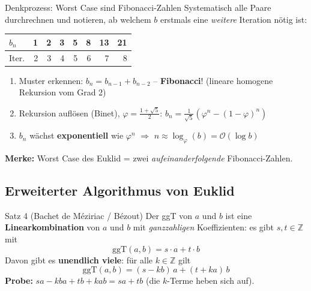 \documentclass[a4paper, fontsize=7pt]{scrartcl}
\def\Z{\mathbb{Z}}  %
\def\oof{\mathcal{O}}
\renewcommand*{\arraystretch}{1.5}  %
\begin{document}
\begin{subbox}{Denkprozess: Worst Case sind Fibonacci-Zahlen}
Systematisch alle Paare durchrechnen und notieren, ab welchem $b$ erstmals
eine \emph{weitere} Iteration nötig ist:
\renewcommand*{\arraystretch}{1.1}
\begin{center}
\setlength{\tabcolsep}{3pt}
\begin{tabular}{@{}l|rrrrrrr@{}}
$b_n$ & 1 & 2 & 3 & 5 & 8 & 13 & 21 \\
\hline
Iter. & 2 & 3 & 4 & 5 & 6 & 7 & 8
\end{tabular}
\end{center}
\begin{enumerate}
    \item Muster erkennen: $b_n = b_{n-1} + b_{n-2}$ -- \textbf{Fibonacci}!
          (lineare homogene Rekursion vom Grad 2)
    \item Rekursion auflösen (Binet), $\varphi = \frac{1+\sqrt5}{2}$:
          $b_n = \frac{1}{\sqrt5}\left(\varphi^n - (1-\varphi)^n\right)$
    \item $b_n$ wächst \textbf{exponentiell} wie $\varphi^n$
          $\Rightarrow$ $n \approx \log_\varphi(b) = \oof(\log b)$
\end{enumerate}
\textbf{Merke:} Worst Case des Euklid = zwei \emph{aufeinanderfolgende}
Fibonacci-Zahlen.
\end{subbox}

\subsection{Erweiterter Algorithmus von Euklid}

\begin{mainbox}{Satz 4 (Bachet de Méziriac / Bézout)}
Der ggT von $a$ und $b$ ist eine \textbf{Linearkombination} von $a$ und $b$
mit \emph{ganzzahligen} Koeffizienten: es gibt $s,t \in \Z$ mit
$$\boxed{\mathrm{ggT}(a,b) = s \cdot a + t \cdot b}$$
Davon gibt es \textbf{unendlich viele}: für alle $k \in \Z$ gilt
$$\mathrm{ggT}(a,b) = (s - k b)\, a + (t + k a)\, b$$
\textbf{Probe:} $sa - kba + tb + kab = sa + tb$ \checkmark{} (die
$k$-Terme heben sich auf).
\end{mainbox}
\end{document}
